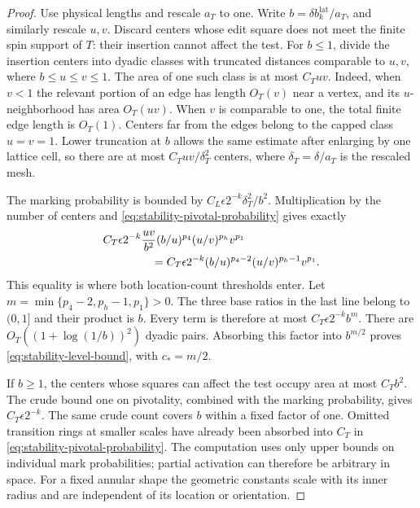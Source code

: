 \begin{proof}
Use physical lengths and rescale $a_T$ to one.  Write
$b=\delta b_k^{\mathrm{lat}}/a_T$, and similarly rescale $u,v$.
Discard centers whose edit square does not meet the finite spin
support of $T$: their insertion cannot affect the test.
For $b\leq1$, divide the insertion centers into dyadic classes
with truncated distances comparable to $u,v$, where
$b\leq u\leq v\leq1$.  The area of one such class is at most
$C_Tuv$.  Indeed, when $v<1$ the relevant portion of an edge
has length $O_T(v)$ near a vertex, and its $u$-neighborhood
has area $O_T(uv)$.  When $v$ is comparable to one, the total
finite edge length is $O_T(1)$.  Centers far from the edges
belong to the capped class $u=v=1$.  Lower truncation at $b$
allows the same estimate after enlarging by one lattice cell,
so there are at most $C_Tuv/\delta_T^2$ centers, where
$\delta_T=\delta/a_T$ is the rescaled mesh.

The marking probability is bounded by
$C_L\epsilon2^{-k}\delta_T^2/b^2$.  Multiplication by the
number of centers and \eqref{eq:stability-pivotal-probability}
gives exactly
\begin{align}
 &C_T\epsilon2^{-k}\frac{uv}{b^2}
          (b/u)^{p_4}(u/v)^{p_h}v^{p_1}\nonumber\\
 &\hspace{15mm}=
 C_T\epsilon2^{-k}
          (b/u)^{p_4-2}(u/v)^{p_h-1}v^{p_1}.
 \label{eq:stability-area-factor}
\end{align}
This equality is where both location-count thresholds enter.
Let
$m=\min\{p_4-2,p_h-1,p_1\}>0$.  The three base ratios in the
last line belong to $(0,1]$ and their product is $b$.  Every
term is therefore at most $C_T\epsilon2^{-k}b^m$.
There are $O_T((1+\log(1/b))^2)$ dyadic pairs.  Absorbing
this factor into $b^{m/2}$ proves
\eqref{eq:stability-level-bound}, with $c_*=m/2$.

If $b\geq1$, the centers whose squares can affect the test
occupy area at most $C_Tb^2$.  The crude bound one on
pivotality, combined with the marking probability, gives
$C_T\epsilon2^{-k}$.  The same crude count covers $b$ within
a fixed factor of one.  Omitted transition rings at smaller
scales have already been absorbed into $C_T$ in
\eqref{eq:stability-pivotal-probability}.
The computation uses only upper bounds on individual mark
probabilities; partial activation can therefore be arbitrary
in space.  For a fixed annular shape the geometric constants
scale with its inner radius and are independent of its
location or orientation.
\end{proof}


